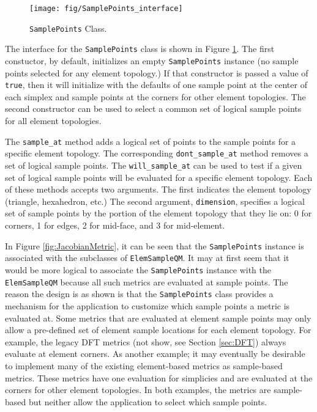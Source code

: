 \documentclass{article}
\begin{document}
\begin{figure}[htb]
\begin{center}
\texttt{[image: fig/SamplePoints\_interface]}
\caption{\texttt{SamplePoints} Class.\label{fig:SamplePoints}}
\end{center}
\end{figure}

The interface for the \texttt{SamplePoints} class is shown in Figure \ref{fig:SamplePoints}.  The first constuctor, by default, initializes an empty \texttt{SamplePoints} instance (no sample points selected for any element topology.)  If that constructor is passed a value of \texttt{true}, then it will initialize with the defaults of one sample point at the center of each simplex and sample points at the corners for other element topologies.  The second constructor can be used to select a common set of logical sample points for all element topologies.  

The \texttt{sample\_at} method adds a logical set of points to the sample points for a specific element topology.  The corresponding \texttt{dont\_sample\_at} method removes a set of logical sample points.  The \texttt{will\_sample\_at} can be used to test if a given set of logical sample points will be evaluated for a specific element topology.  Each of these methods accepts two arguments.  The first indicates the element topology (triangle, hexahedron, etc.)  The second argument, \texttt{dimension}, specifies a logical set of sample points by the portion of the element topology that they lie on: 0 for corners, 1 for edges, 2 for mid-face, and 3 for mid-element.  

In Figure \ref{fig:JacobianMetric}, it can be seen that the \texttt{SamplePoints} instance is associated with the subclasses of \texttt{ElemSampleQM}.  It may at first seem that it would be more logical to associate the \texttt{SamplePoints} instance with the \texttt{ElemSampleQM} because all such metrics are evaluated at sample points.  The reason the design is as shown is that the \texttt{SamplePoints} class provides a mechanism for the application to customize which sample points a metric is evaluated at.  Some metrics that are evaluated at element sample points may only allow a pre-defined set of element sample locations for each element topology.  For example, the legacy DFT metrics (not show, see Section \ref{sec:DFT}) always evaluate at element corners.  As another example; it may eventually be desirable to implement many of the existing element-based metrics as sample-based metrics.  These metrics have one evaluation for simplicies and are evaluated at the corners for other element topologies.  In both examples, the metrics are sample-based but neither allow the application to select which sample points.
\end{document}
